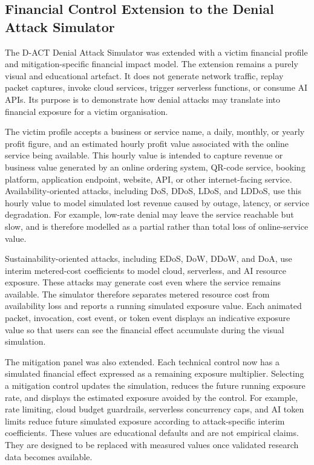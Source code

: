 \subsection{Financial Control Extension to the Denial Attack Simulator}
\label{app:financial_control_simulator_update}

The D-ACT Denial Attack Simulator was extended with a victim financial profile and mitigation-specific financial impact model. The extension remains a purely visual and educational artefact. It does not generate network traffic, replay packet captures, invoke cloud services, trigger serverless functions, or consume AI APIs. Its purpose is to demonstrate how denial attacks may translate into financial exposure for a victim organisation.

The victim profile accepts a business or service name, a daily, monthly, or yearly profit figure, and an estimated hourly profit value associated with the online service being available. This hourly value is intended to capture revenue or business value generated by an online ordering system, QR-code service, booking platform, application endpoint, website, API, or other internet-facing service. Availability-oriented attacks, including DoS, DDoS, LDoS, and LDDoS, use this hourly value to model simulated lost revenue caused by outage, latency, or service degradation. For example, low-rate denial may leave the service reachable but slow, and is therefore modelled as a partial rather than total loss of online-service value.

Sustainability-oriented attacks, including EDoS, DoW, DDoW, and DoA, use interim metered-cost coefficients to model cloud, serverless, and AI resource exposure. These attacks may generate cost even where the service remains available. The simulator therefore separates metered resource cost from availability loss and reports a running simulated exposure value. Each animated packet, invocation, cost event, or token event displays an indicative exposure value so that users can see the financial effect accumulate during the visual simulation.

The mitigation panel was also extended. Each technical control now has a simulated financial effect expressed as a remaining exposure multiplier. Selecting a mitigation control updates the simulation, reduces the future running exposure rate, and displays the estimated exposure avoided by the control. For example, rate limiting, cloud budget guardrails, serverless concurrency caps, and AI token limits reduce future simulated exposure according to attack-specific interim coefficients. These values are educational defaults and are not empirical claims. They are designed to be replaced with measured values once validated research data becomes available.
